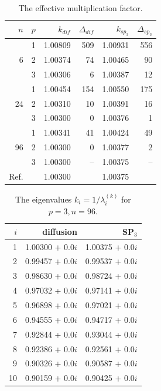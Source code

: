 \documentclass[authoryear]{elsarticle}
\begin{document}
\begin{table}[h]
\caption{The effective multiplication factor.}
\label{tab:iaea_cosym_lambda}
\begin{center}
\begin{tabular}{r r r r r r}
\hline
$n$ & $p$ & $k_{dif}$ & $\Delta_{dif}$ &$k_{sp_3}$& $\Delta_{sp_3}$ \\
\hline
	& 1	& 1.00809& 509& 1.00931& 556\\
6	& 2	& 1.00374&  74& 1.00465&  90\\
	& 3	& 1.00306&   6& 1.00387&  12\\
\hline
	& 1	& 1.00454& 154& 1.00550& 175\\
24& 2	& 1.00310&  10& 1.00391&  16\\
	& 3	& 1.00300&   0& 1.00376&   1\\ 
\hline
	& 1	& 1.00341&  41& 1.00424&  49\\
96& 2	& 1.00300&   0& 1.00377&   2\\
	& 3	& 1.00300&  --& 1.00375&  --\\ 
\hline
Ref.&   & 1.00300&    & 1.00375&    \\ 
\hline
\end{tabular}
\end{center}
\end{table}

\begin{table}[h]
\caption{The eigenvalues $k_i=1/\lambda_i^{(k)}$ for $p=3, n=96$.}
\label{tab:iaea_cosym_lambda_10}
\begin{center}
\begin{tabular}{rrr}
\hline
$i$ & diffusion & SP$_3$  \\
\hline
1 & 1.00300 + 0.0$i$ & 1.00375 + 0.0$i$\\
2 & 0.99457 + 0.0$i$ & 0.99537 + 0.0$i$\\
3 & 0.98630 + 0.0$i$ & 0.98724 + 0.0$i$\\
4 & 0.97032 + 0.0$i$ & 0.97141 + 0.0$i$\\
5 & 0.96898 + 0.0$i$ & 0.97021 + 0.0$i$\\
6 & 0.94555 + 0.0$i$ & 0.94717 + 0.0$i$\\
7 & 0.92844 + 0.0$i$ & 0.93044 + 0.0$i$\\
8 & 0.92386 + 0.0$i$ & 0.92561 + 0.0$i$\\
9 & 0.90326 + 0.0$i$ & 0.90587 + 0.0$i$\\
10 & 0.90159 + 0.0$i$ & 0.90425 + 0.0$i$\\
\hline
\end{tabular}
\end{center}
\end{table}
\end{document}
